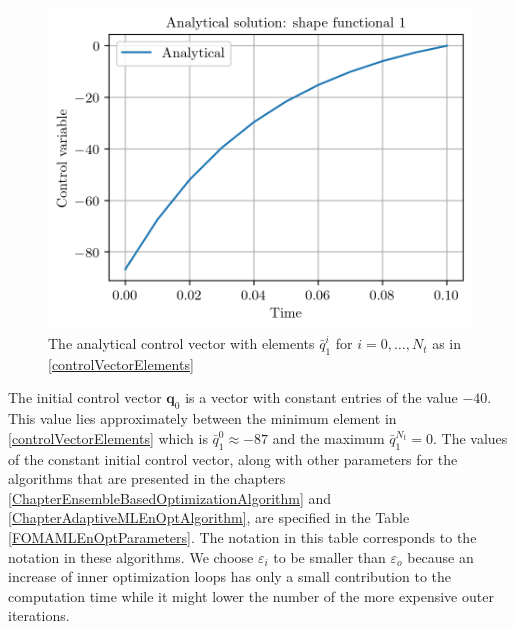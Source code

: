 \begin{figure}
\centering
\includegraphics{Plots/analyticalControlVector.png}
\caption{\label{AnalyticalControlVectorPlot}The analytical control vector with elements $\bar{q}^i_1$ for $i=0,\dotsc,N_t$ as in \eqref{controlVectorElements}}
\end{figure}

The initial control vector $\mathbf{q}_0$ is a vector with constant entries of the value $-40$. This value lies approximately between the minimum element in \eqref{controlVectorElements} which is $\bar{q}^0_1\approx-87$ and the maximum $\bar{q}^{N_t}_1=0$. The values of the constant initial control vector, along with other parameters for the algorithms that are presented in the chapters \ref{ChapterEnsembleBasedOptimizationAlgorithm} and \ref{ChapterAdaptiveMLEnOptAlgorithm}, are specified in the Table \ref{FOMAMLEnOptParameters}. The notation in this table corresponds to the notation in these algorithms. We choose $\varepsilon_i$ to be smaller than $\varepsilon_o$ because an increase of inner optimization loops has only a small contribution to the computation time while it might lower the number of the more expensive outer iterations.

